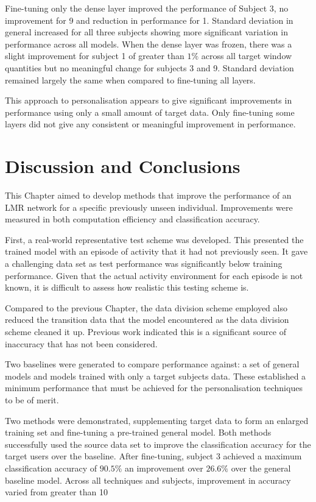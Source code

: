 Fine-tuning only the dense layer improved the performance of Subject 3, no improvement for 9 and reduction in performance for 1. Standard deviation in general increased for all three subjects showing more significant variation in performance across all models. When the dense layer was frozen, there was a slight improvement for subject 1 of greater than $1\%$ across all target window quantities but no meaningful change for subjects 3 and 9. Standard deviation remained largely the same when compared to fine-tuning all layers.

This approach to personalisation appears to give significant improvements in performance using only a small amount of target data. Only fine-tuning some layers did not give any consistent or meaningful improvement in performance.

\section{Discussion and Conclusions}
\label{sec:personalisation-discussion}
This Chapter aimed to develop methods that improve the performance of an LMR network for a specific previously unseen individual. Improvements were measured in both computation efficiency and classification accuracy.

First, a real-world representative test scheme was developed. This presented the trained model with an episode of activity that it had not previously seen. It gave a challenging data set as test performance was significantly below training performance. Given that the actual activity environment for each episode is not known, it is difficult to assess how realistic this testing scheme is. 

Compared to the previous Chapter, the data division scheme employed also reduced the transition data that the model encountered as the data division scheme cleaned it up. Previous work indicated this is a significant source of inaccuracy that has not been considered.

Two baselines were generated to compare performance against: a set of general models and models trained with only a target subjects data. These established a minimum performance that must be achieved for the personalisation techniques to be of merit.

Two methods were demonstrated, supplementing target data to form an enlarged training set and fine-tuning a pre-trained general model. Both methods successfully used the source data set to improve the classification accuracy for the target users over the baseline. After fine-tuning, subject 3 achieved a maximum classification accuracy of $90.5\%$ an improvement over $26.6\%$ over the general baseline model. Across all techniques and subjects, improvement in accuracy varied from greater than 10%

